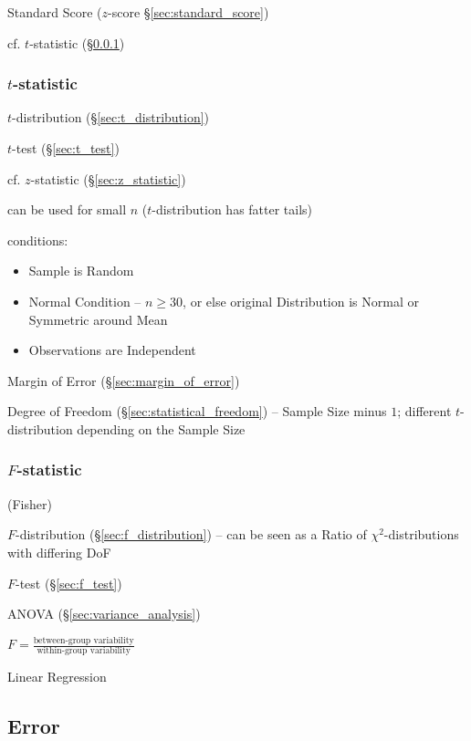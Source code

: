Standard Score ($z$-score \S\ref{sec:standard_score})

cf. $t$-statistic (\S\ref{sec:t_statistic})



\subsubsection{$t$-statistic}\label{sec:t_statistic}

$t$-distribution (\S\ref{sec:t_distribution})

$t$-test (\S\ref{sec:t_test})

cf. $z$-statistic (\S\ref{sec:z_statistic})

can be used for small $n$ ($t$-distribution has fatter tails)

conditions:
\begin{itemize}
  \item Sample is Random
  \item Normal Condition -- $n \geq 30$, or else original Distribution is Normal
    or Symmetric around Mean
  \item Observations are Independent
\end{itemize}

Margin of Error (\S\ref{sec:margin_of_error})

Degree of Freedom (\S\ref{sec:statistical_freedom}) -- Sample Size minus $1$;
different $t$-distribution depending on the Sample Size



\subsubsection{$F$-statistic}\label{sec:f_statistic}

(Fisher)

$F$-distribution (\S\ref{sec:f_distribution}) -- can be seen as a Ratio of
$\chi^2$-distributions with differing DoF

$F$-test (\S\ref{sec:f_test})

ANOVA (\S\ref{sec:variance_analysis})

$F = \frac{\text{between-group variability}}{\text{within-group variability}}$

Linear Regression



\subsection{Error}\label{sec:error}

